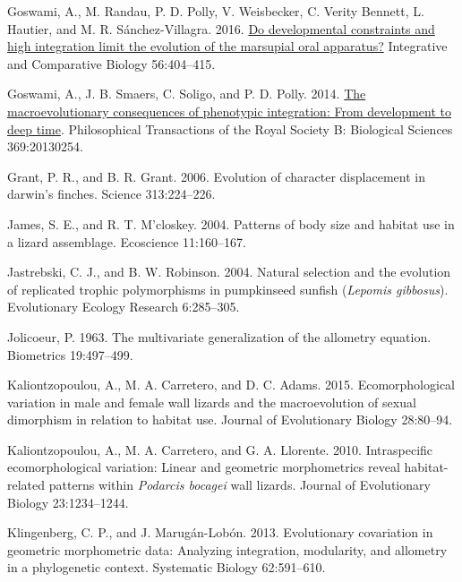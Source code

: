 \documentclass[
  11pt,
]{article}
\newlength{\cslhangindent}
\newlength{\cslentryspacingunit} %
\newenvironment{CSLReferences}[2] %
 {%
  \setlength{\parindent}{0pt}
  \ifodd #1
  \let\oldpar\par
  \def\par{\hangindent=\cslhangindent\oldpar}
  \fi
  \setlength{\parskip}{#2\cslentryspacingunit}
 }%
 {}
\begin{document}
\begin{CSLReferences}{1}{0}
\leavevmode{}%
Goswami, A., M. Randau, P. D. Polly, V. Weisbecker, C. Verity Bennett,
L. Hautier, and M. R. Sánchez-Villagra. 2016.
\href{https://doi.org/10.1093/icb/icw039}{Do developmental constraints
and high integration limit the evolution of the marsupial oral
apparatus?} Integrative and Comparative Biology 56:404--415.

\leavevmode{}%
Goswami, A., J. B. Smaers, C. Soligo, and P. D. Polly. 2014.
\href{https://doi.org/10.1098/rstb.2013.0254}{The macroevolutionary
consequences of phenotypic integration: From development to deep time}.
Philosophical Transactions of the Royal Society B: Biological Sciences
369:20130254.

\leavevmode{}%
Grant, P. R., and B. R. Grant. 2006. Evolution of character displacement
in darwin's finches. Science 313:224--226.

\leavevmode{}%
James, S. E., and R. T. M'closkey. 2004. Patterns of body size and
habitat use in a lizard assemblage. Ecoscience 11:160--167.

\leavevmode{}%
Jastrebski, C. J., and B. W. Robinson. 2004. Natural selection and the
evolution of replicated trophic polymorphisms in pumpkinseed sunfish
(\emph{{L}epomis gibbosus}). Evolutionary Ecology Research 6:285--305.

\leavevmode{}%
Jolicoeur, P. 1963. The multivariate generalization of the allometry
equation. Biometrics 19:497--499.

\leavevmode{}%
Kaliontzopoulou, A., M. A. Carretero, and D. C. Adams. 2015.
Ecomorphological variation in male and female wall lizards and the
macroevolution of sexual dimorphism in relation to habitat use. Journal
of Evolutionary Biology 28:80--94.

\leavevmode{}%
Kaliontzopoulou, A., M. A. Carretero, and G. A. Llorente. 2010.
Intraspecific ecomorphological variation: Linear and geometric
morphometrics reveal habitat-related patterns within \emph{{P}odarcis
bocagei} wall lizards. Journal of Evolutionary Biology 23:1234--1244.

\leavevmode{}%
Klingenberg, C. P., and J. Marugán-Lobón. 2013. Evolutionary covariation
in geometric morphometric data: Analyzing integration, modularity, and
allometry in a phylogenetic context. Systematic Biology 62:591--610.


\end{CSLReferences}
\end{document}
